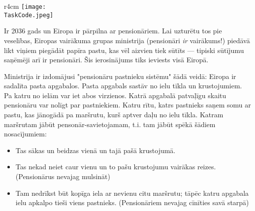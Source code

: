 \documentclass{boi2014-lv}
\renewcommand{\TaskCode}{postmen}
\begin{document}
    \begin{wrapfigure}[8]{r}{4cm}
        \vspace{-18pt}
		\texttt{[image: \\TaskCode.jpeg]}
	\end{wrapfigure}
    Ir 2036 gads un Eiropa ir pārpilna ar pensionāriem. Lai uzturētu tos pie veselības, Eiropas vairākuma grupas ministrija (pensionāri \emph{ir} vairākums!) piedāvā likt viņiem piegādāt papīra pastu, kas vēl aizvien tiek sūtīts --- tipiski sūtījumu saņēmēji arī ir pensionāri. Šis ierosinājums tiks ieviests visā Eiropā.

		Ministrija ir izdomājusi "pensionāru pastnieku sistēmu" šādā veidā: Eiropa ir sadalīta pasta apgabalos. Pasta apgabals sastāv no ielu tīkla un krustojumiem. Pa katru no ielām var iet abos virzienos. Katrā apgabalā patvaļīgu skaitu pensionāru var nolīgt par pastniekiem. Katru rītu, katrs pastnieks saņem somu ar pastu, kas jānogādā pa maršrutu, kurš aptver daļu no ielu tīkla. Katram maršrutam jābūt pensonār-savietojamam, t.i. tam jābūt spēkā šādiem nosacījumiem:

    \begin{itemize}
        \item Tas sākas un beidzas vienā un tajā pašā krustojumā. %
        \item Tas nekad neiet caur vienu un to pašu krustojumu vairākas reizes. (Pensionārus nevajag mulsināt)%
        \item Tam nedrīkst būt kopīga iela ar nevienu citu maršrutu; tāpēc katru apgabala ielu apkalpo tieši viens pastnieks. (Pensionāriem nevajag cīnīties savā starpā) %
    \end{itemize}
\end{document}
